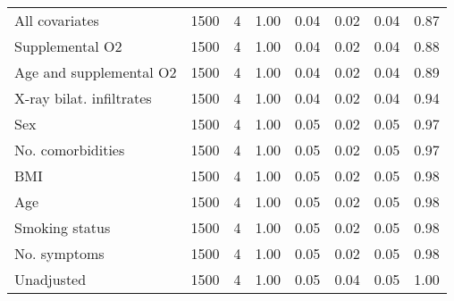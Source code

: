 \documentclass{article}
\begin{document}
\begin{table}
\begin{tabular}{lccccccc}
All covariates & 1500 & 4 & 1.00 & 0.04 & 0.02 & 0.04 & 0.87\\
Supplemental O2 & 1500 & 4 & 1.00 & 0.04 & 0.02 & 0.04 & 0.88\\
Age and supplemental O2 & 1500 & 4 & 1.00 & 0.04 & 0.02 & 0.04 & 0.89\\
X-ray bilat. infiltrates & 1500 & 4 & 1.00 & 0.04 & 0.02 & 0.04 & 0.94\\
Sex & 1500 & 4 & 1.00 & 0.05 & 0.02 & 0.05 & 0.97\\
No. comorbidities & 1500 & 4 & 1.00 & 0.05 & 0.02 & 0.05 & 0.97\\
BMI & 1500 & 4 & 1.00 & 0.05 & 0.02 & 0.05 & 0.98\\
Age & 1500 & 4 & 1.00 & 0.05 & 0.02 & 0.05 & 0.98\\
Smoking status & 1500 & 4 & 1.00 & 0.05 & 0.02 & 0.05 & 0.98\\
No. symptoms & 1500 & 4 & 1.00 & 0.05 & 0.02 & 0.05 & 0.98\\
Unadjusted & 1500 & 4 & 1.00 & 0.05 & 0.04 & 0.05 & 1.00\\ \bottomrule
\hline
\end{tabular}
\end{table}
\end{document}
